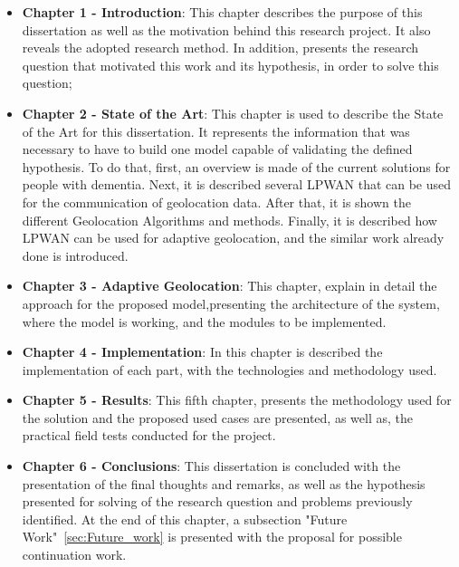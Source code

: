 \begin{itemize}
	\item \textbf{Chapter 1 - Introduction}: This chapter describes the purpose of this dissertation as well as the motivation behind this research project. It also reveals the adopted research method. In addition,  presents the research question that motivated this work and its hypothesis, in order to solve this question;
	
	
	\item \textbf{Chapter 2 - State of the Art}: This chapter is used to describe the State of the Art for this dissertation. It represents the information that was necessary to have to build one model capable of validating the defined hypothesis.
	To do that, first, an overview is made of the current solutions for people with dementia. Next, it is described several LPWAN that can be used for the communication of geolocation data. After that, it is shown the different Geolocation Algorithms and methods. 
	Finally, it is described how LPWAN can be used for adaptive geolocation, and the similar work already done is introduced. 
	
	
	\item \textbf{Chapter 3 - Adaptive Geolocation}: This chapter, explain in detail the approach for the  proposed model,presenting the architecture of the system, where the model is working, and the modules to be implemented. 
	
	
	\item \textbf{Chapter 4 - Implementation}:  In  this chapter is described  the implementation of each part, with the technologies and methodology used.
	
	
	\item \textbf{Chapter 5 - Results}: This fifth chapter, presents the methodology used for the solution and the  proposed used cases are presented, as well as, the practical field tests conducted for the project. 
	
	\item \textbf{Chapter 6 - Conclusions}: This dissertation is concluded with the presentation of the final thoughts and remarks, as well as the hypothesis presented for solving of the research question and problems previously identified. At the end of this chapter, a subsection "Future Work"~\ref{sec:Future_work} is presented with the proposal for possible continuation work. 

\end{itemize}



